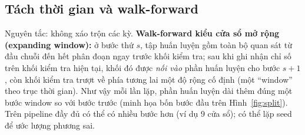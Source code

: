 \documentclass[12pt,a4paper]{article}
\begin{document}
\subsection{Tách thời gian và walk-forward}
Nguyên tắc: không xáo trộn các kỳ. \textbf{Walk-forward kiểu cửa sổ mở rộng (expanding window):} ở bước thứ $s$, tập huấn luyện gồm toàn bộ quan sát từ đầu chuỗi đến hết phân đoạn ngay trước khối kiểm tra; sau khi ghi nhận chỉ số trên khối kiểm tra hiện tại, khối đó được \emph{nối vào} phần huấn luyện cho bước $s{+}1$, còn khối kiểm tra trượt về phía tương lai một độ rộng cố định (một ``window'' theo trục thời gian). Như vậy mỗi lần lặp, phần huấn luyện dài thêm đúng một bước window so với bước trước (minh họa bốn bước đầu trên Hình~\ref{fig:split}). Trên pipeline đầy đủ có thể có nhiều bước hơn (ví dụ 9 cửa sổ); có thể lặp seed để ước lượng phương sai.
\end{document}
